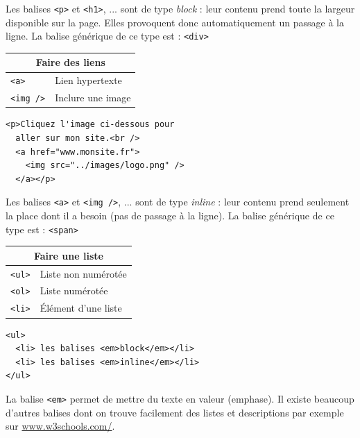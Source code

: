 Les balises \texttt{<p>} et \texttt{<h1>}, ... sont de type \emph{block} : leur contenu prend toute la largeur disponible sur la page. Elles provoquent donc automatiquement un passage à la ligne. La balise générique de ce type est : \texttt{<div>}

\medskip

\begin{multicols}{2}
\begin{tabular}{|ll|}
\hline
\multicolumn{2}{|c|}{Faire des liens}\\
\hline
\texttt{<a>} & Lien hypertexte\\
\texttt{<img />} & Inclure une image \\
\hline
\end{tabular}


\begin{verbatim}
<p>Cliquez l'image ci-dessous pour 
  aller sur mon site.<br />
  <a href="www.monsite.fr">
    <img src="../images/logo.png" />
  </a></p>
\end{verbatim}
\end{multicols}

Les balises \texttt{<a>} et \texttt{<img />}, ... sont de type \emph{inline} : leur contenu prend seulement la place dont il a besoin (pas de passage à la ligne). La balise générique de ce type est : \texttt{<span>}

\medskip

\begin{multicols}{2}
\begin{tabular}{|ll|}
\hline
\multicolumn{2}{|c|}{Faire une liste}\\
\hline
\texttt{<ul>} & Liste non numérotée\\
\texttt{<ol>} & Liste numérotée\\
\texttt{<li>} & Élément d'une liste\\
\hline
\end{tabular}


\begin{verbatim}
<ul>
  <li> les balises <em>block</em></li>
  <li> les balises <em>inline</em></li>
</ul>
\end{verbatim}
\end{multicols}

La  balise \texttt{<em>} permet de mettre du texte en valeur (emphase). Il existe beaucoup d'autres balises dont on trouve facilement des listes et descriptions par exemple sur \href{https://www.w3schools.com/}{www.w3schools.com/}.

